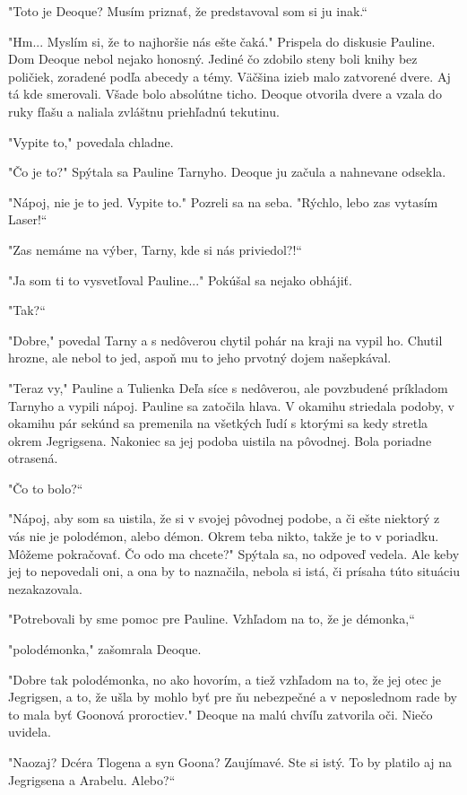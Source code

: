 \documentclass{book}
\begin{document}
"Toto je Deoque? Musím priznať, že predstavoval som si ju inak.“

"Hm... Myslím si, že to najhoršie nás ešte čaká."$ $ Prispela do diskusie Pauline.
Dom Deoque nebol nejako honosný. Jediné čo zdobilo steny boli knihy bez poličiek, zoradené podľa abecedy a témy. Väčšina izieb malo zatvorené dvere. Aj tá kde smerovali. Všade bolo absolútne ticho. Deoque otvorila dvere a vzala do ruky fľašu a naliala zvláštnu priehľadnú tekutinu.

"Vypite to,"$ $ povedala chladne.

"Čo je to?"$ $ Spýtala sa Pauline Tarnyho. Deoque ju začula a nahnevane odsekla.

"Nápoj, nie je to jed. Vypite to."$ $ Pozreli sa na seba. "Rýchlo, lebo zas vytasím Laser!“

"Zas nemáme na výber, Tarny, kde si nás priviedol?!“

"Ja som ti to vysvetľoval Pauline..."$ $ Pokúšal sa nejako obhájiť.

"Tak?“

"Dobre,"$ $ povedal Tarny a s nedôverou chytil pohár na kraji na vypil ho. Chutil hrozne, ale nebol to jed, aspoň mu to jeho prvotný dojem našepkával.

"Teraz vy,"$ $ Pauline a Tulienka Deľa síce s nedôverou, ale povzbudené príkladom Tarnyho a vypili nápoj. Pauline sa zatočila hlava. V okamihu striedala podoby, v okamihu pár sekúnd sa premenila na všetkých ľudí s ktorými sa kedy stretla okrem Jegrigsena. Nakoniec sa jej podoba uistila na pôvodnej. Bola poriadne otrasená.

"Čo to bolo?“

"Nápoj, aby som sa uistila, že si v svojej pôvodnej podobe, a či ešte niektorý z vás nie je polodémon, alebo démon. Okrem teba nikto, takže je to v poriadku. Môžeme pokračovať. Čo odo ma chcete?"$ $ Spýtala sa, no odpoveď vedela. Ale keby jej to nepovedali oni, a ona by to naznačila, nebola si istá, či prísaha túto situáciu nezakazovala.

"Potrebovali by sme pomoc pre Pauline. Vzhľadom na to, že je démonka,“

"polodémonka,"$ $ zašomrala Deoque.

"Dobre tak polodémonka, no ako hovorím, a tiež vzhľadom na to, že jej otec je Jegrigsen, a to, že ušla by mohlo byť pre ňu nebezpečné a v neposlednom rade by to mala byť Goonová proroctiev."$ $ Deoque na malú chvíľu zatvorila oči. Niečo uvidela.

"Naozaj? Dcéra Tlogena a syn Goona? Zaujímavé. Ste si istý. To by platilo aj na Jegrigsena a Arabelu. Alebo?“
\end{document}
